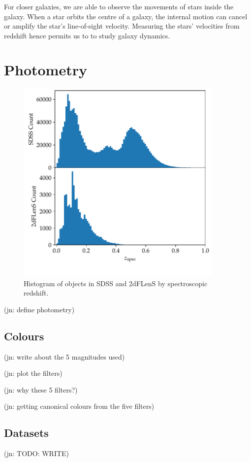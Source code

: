 \documentclass[11pt,twoside,openright]{report}
\newcommand\jn[1]{{\color{red}(jn: #1)}}
\begin{document}
  For closer galaxies, we are able to observe the movements of stars inside the galaxy. When a star orbits the centre of a galaxy, the internal motion can cancel or amplify the star's line-of-sight velocity. Measuring the stars' velocities from redshift hence permits us to to study galaxy dynamics.

\chapter{Photometry}

  \begin{figure}
    \centering
    \includegraphics[width=0.9\textwidth]{zpec_hist.pdf}
    \caption{Histogram of objects in SDSS and 2dFLenS by spectroscopic redshift.}
    \label{fig:spec_hist}
  \end{figure}

  \jn{define photometry}

  \section{Colours}

  \jn{write about the 5 magnitudes used}

  \jn{plot the filters}

  \jn{why these 5 filters?}

  \jn{getting canonical colours from the five filters}

  \section{Datasets}
  \jn{TODO: WRITE}
\end{document}

